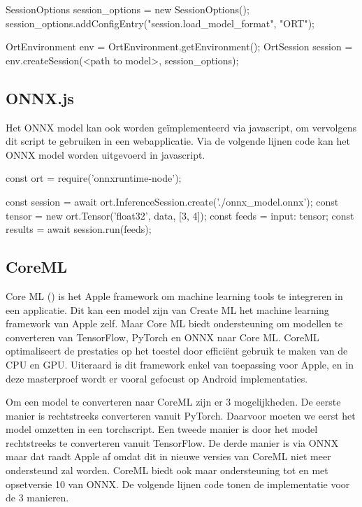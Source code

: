 \begin{python}
SessionOptions session_options = new SessionOptions();
session_options.addConfigEntry("session.load_model_format", "ORT");
	
OrtEnvironment env = OrtEnvironment.getEnvironment();
OrtSession session = env.createSession(<path to model>, session_options);
\end{python}

\subsection{ONNX.js}
Het ONNX model kan ook worden ge\"implementeerd via javascript, om vervolgens dit script te gebruiken in een webapplicatie.
Via de volgende lijnen code kan het ONNX model worden uitgevoerd in javascript.

\begin{python}
const ort = require('onnxruntime-node'); 

const session = await ort.InferenceSession.create('./onnx_model.onnx');
const tensor = new ort.Tensor('float32', data, [3, 4]); 
const feeds = { input: tensor}; 
const results = await session.run(feeds);
\end{python}

\subsection{CoreML}
Core ML (\cite{Apple_CoreML_2018}) is het Apple framework om machine learning tools te integreren in een applicatie.
Dit kan een model zijn van Create ML het machine learning framework van Apple zelf.
Maar Core ML biedt ondersteuning om modellen te converteren van TensorFlow, PyTorch en ONNX naar Core ML.
CoreML optimaliseert de prestaties op het toestel door effici\"ent gebruik te maken van de CPU en GPU.
Uiteraard is dit framework enkel van toepassing voor Apple, en in deze masterproef wordt er vooral gefocust op Android implementaties.

Om een model te converteren naar CoreML zijn er 3 mogelijkheden.
De eerste manier is rechtstreeks converteren vanuit PyTorch.
Daarvoor moeten we eerst het model omzetten in een torchscript.
Een tweede manier is door het model rechtstreeks te converteren vanuit TensorFlow.
De derde manier is via ONNX maar dat raadt Apple af omdat dit in nieuwe versies van CoreML niet meer ondersteund zal worden.
CoreML biedt ook maar ondersteuning tot en met opsetversie 10 van ONNX.
De volgende lijnen code tonen de implementatie voor de 3 manieren.

